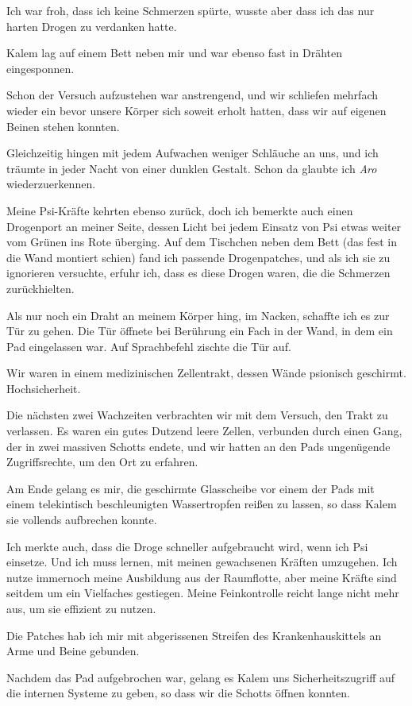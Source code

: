\documentclass[11pt]{scrartcl}
\begin{document}
Ich war froh, dass ich keine Schmerzen spürte, wusste aber dass ich das
nur harten Drogen zu verdanken hatte.

Kalem lag auf einem Bett neben mir und war ebenso fast in Drähten
eingesponnen.

Schon der Versuch aufzustehen war anstrengend, und wir schliefen
mehrfach wieder ein bevor unsere Körper sich soweit erholt hatten, dass
wir auf eigenen Beinen stehen konnten.

Gleichzeitig hingen mit jedem Aufwachen weniger Schläuche an uns, und
ich träumte in jeder Nacht von einer dunklen Gestalt. Schon da glaubte
ich \emph{Aro} wiederzuerkennen.

Meine Psi-Kräfte kehrten ebenso zurück, doch ich bemerkte auch einen
Drogenport an meiner Seite, dessen Licht bei jedem Einsatz von Psi etwas
weiter vom Grünen ins Rote überging. Auf dem Tischchen neben dem Bett
(das fest in die Wand montiert schien) fand ich passende Drogenpatches,
und als ich sie zu ignorieren versuchte, erfuhr ich, dass es diese
Drogen waren, die die Schmerzen zurückhielten.

Als nur noch ein Draht an meinem Körper hing, im Nacken, schaffte ich es
zur Tür zu gehen. Die Tür öffnete bei Berührung ein Fach in der Wand, in
dem ein Pad eingelassen war. Auf Sprachbefehl zischte die Tür auf.

Wir waren in einem medizinischen Zellentrakt, dessen Wände psionisch
geschirmt. Hochsicherheit.

Die nächsten zwei Wachzeiten verbrachten wir mit dem Versuch, den Trakt
zu verlassen. Es waren ein gutes Dutzend leere Zellen, verbunden durch
einen Gang, der in zwei massiven Schotts endete, und wir hatten an den
Pads ungenügende Zugriffsrechte, um den Ort zu erfahren.

Am Ende gelang es mir, die geschirmte Glasscheibe vor einem der Pads mit
einem telekintisch beschleunigten Wassertropfen reißen zu lassen, so
dass Kalem sie vollends aufbrechen konnte.

Ich merkte auch, dass die Droge schneller aufgebraucht wird, wenn ich
Psi einsetze. Und ich muss lernen, mit meinen gewachsenen Kräften
umzugehen. Ich nutze immernoch meine Ausbildung aus der Raumflotte, aber
meine Kräfte sind seitdem um ein Vielfaches gestiegen. Meine
Feinkontrolle reicht lange nicht mehr aus, um sie effizient zu nutzen.

Die Patches hab ich mir mit abgerissenen Streifen des Krankenhauskittels
an Arme und Beine gebunden.

Nachdem das Pad aufgebrochen war, gelang es Kalem uns Sicherheitszugriff
auf die internen Systeme zu geben, so dass wir die Schotts öffnen
konnten.
\end{document}
